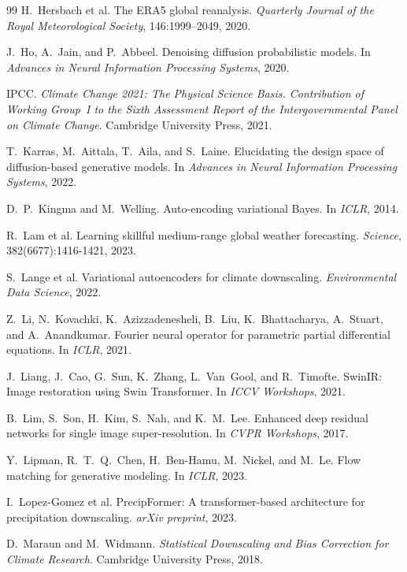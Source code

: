 \documentclass[14pt,a4paper,openany]{extreport}
\theoremstyle{definition}
\begin{document}
\begin{thebibliography}{99}
 H.~Hersbach et al. The ERA5 global reanalysis. \emph{Quarterly Journal of the Royal Meteorological Society}, 146:1999--2049, 2020.

 J.~Ho, A.~Jain, and P.~Abbeel. Denoising diffusion probabilistic models. In \emph{Advances in Neural Information Processing Systems}, 2020.

 IPCC. \emph{Climate Change 2021: The Physical Science Basis. Contribution of Working Group~I to the Sixth Assessment Report of the Intergovernmental Panel on Climate Change}. Cambridge University Press, 2021.

 T.~Karras, M.~Aittala, T.~Aila, and S.~Laine. Elucidating the design space of diffusion-based generative models. In \emph{Advances in Neural Information Processing Systems}, 2022.

 D.~P.~Kingma and M.~Welling. Auto-encoding variational Bayes. In \emph{ICLR}, 2014.

 R.~Lam et al. Learning skillful medium-range global weather forecasting. \emph{Science}, 382(6677):1416-1421, 2023.

 S.~Lange et al. Variational autoencoders for climate downscaling. \emph{Environmental Data Science}, 2022.

 Z.~Li, N.~Kovachki, K.~Azizzadenesheli, B.~Liu, K.~Bhattacharya, A.~Stuart, and A.~Anandkumar. Fourier neural operator for parametric partial differential equations. In \emph{ICLR}, 2021.

 J.~Liang, J.~Cao, G.~Sun, K.~Zhang, L.~Van~Gool, and R.~Timofte. SwinIR: Image restoration using Swin Transformer. In \emph{ICCV Workshops}, 2021.

 B.~Lim, S.~Son, H.~Kim, S.~Nah, and K.~M.~Lee. Enhanced deep residual networks for single image super-resolution. In \emph{CVPR Workshops}, 2017.

 Y.~Lipman, R.~T.~Q.~Chen, H.~Ben-Hamu, M.~Nickel, and M.~Le. Flow matching for generative modeling. In \emph{ICLR}, 2023.

 I.~Lopez-Gomez et al. PrecipFormer: A transformer-based architecture for precipitation downscaling. \emph{arXiv preprint}, 2023.

 D.~Maraun and M.~Widmann. \emph{Statistical Downscaling and Bias Correction for Climate Research}. Cambridge University Press, 2018.


\end{thebibliography}
\end{document}
